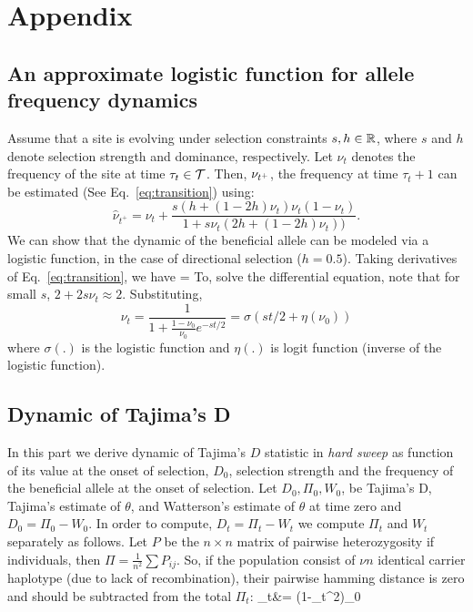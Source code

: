 \documentclass[11pt]{article}
\begin{document}
\section{Appendix}
\subsection{An approximate logistic function  for allele frequency dynamics} \label{app:af}
Assume that a site is evolving under selection constraints $s,h\in
{\mathbb R}$, where $s$ and $h$ denote selection strength and dominance,
respectively. Let $\nu_t$ denotes the frequency of the site at
time $\tau_t\in {\cal T}$. Then, $\nu_{t^+}$, the frequency at time
$\tau_t+1$ can be estimated (See Eq.~\ref{eq:transition}) using: 
\[\hat{\nu}_{t^+}
=\nu_t+\frac{s(h+(1-2h)\nu_t)\nu_t(1-\nu_t)}{1+s\nu_t(2h+(1-2h)\nu_t))}.
  \label{eq:transition}
\]
We can show that the dynamic of the beneficial allele can be modeled
via a logistic function, in the case of directional selection
($h=0.5$). Taking derivatives of Eq.~\ref{eq:transition}, we have
\beq {} = 
\eeq To, solve the differential equation, note that for small $s$,
$2+2s\nu_t \approx 2$. Substituting,
\begin{equation}
\nu_t =\frac{1}{1+\frac{1-\nu_0}{\nu_0}e^{-st/2}} = \sigma(st/2+\eta(\nu_0)) 
\label{eq:inf-pop}
\end{equation}
where $\sigma(.)$ is the logistic function and $\eta(.)$ is logit function 
(inverse of the logistic function). 

\subsection{Dynamic of Tajima's D}\label{app:td}
In this part we derive dynamic of Tajima's $D$ statistic in \emph{hard
  sweep} as function of its value at the onset of selection, $D_0$,
selection strength and the frequency of the beneficial allele at the
onset of selection.  Let $D_0, \Pi_0, W_0$, be Tajima's D, Tajima's
estimate of $\theta$, and Watterson's estimate of $\theta$ at time
zero and $D_0=\Pi_0 - W_0$.  In order to compute, $D_t=\Pi_t - W_t$ we
compute $\Pi_t$ and $W_t$ separately as follows. Let $P$ be the $n
\times n$ matrix of pairwise heterozygosity if individuals, then
$\Pi=\frac{1}{n^2}\sum P_{ij}$. So, if the population consist of $\nu
n$ identical carrier haplotype (due to lack of recombination), their
pairwise hamming distance is zero and should be subtracted from the
total $\Pi_t$: \beq \Pi_t&= (1-\nu_t^2)\Pi_0 \label{eq:tdt0} \eeq
\end{document}
